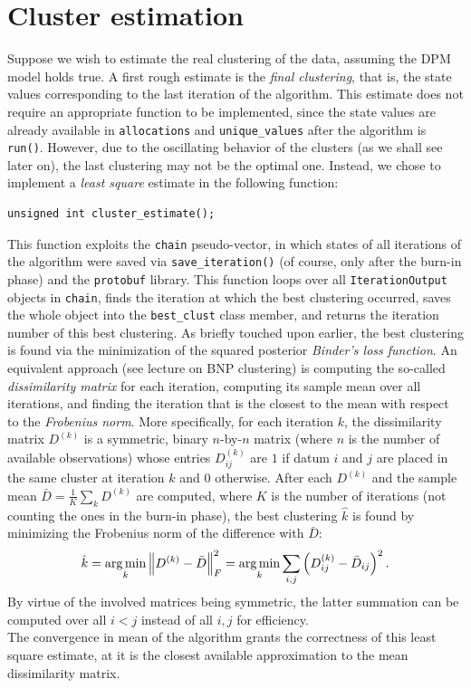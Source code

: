 \section{Cluster estimation}
Suppose we wish to estimate the real clustering of the data, assuming the DPM model holds true.
A first rough estimate is the \emph{final clustering}, that is, the state values corresponding to the last iteration of the algorithm.
This estimate does not require an appropriate function to be implemented, since the state values are already available in \verb|allocations| and \verb|unique_values| after the algorithm is \verb|run()|.
However, due to the oscillating behavior of the clusters (as we shall see later on), the last clustering may not be the optimal one.
Instead, we chose to implement a \emph{least square} estimate in the following function:
\begin{verbatim}
unsigned int cluster_estimate();
\end{verbatim}
This function exploits the \verb|chain| pseudo-vector, in which states of all iterations of the algorithm were saved via \verb|save_iteration()| (of course, only after the burn-in phase) and the \verb|protobuf| library.
This function loops over all \verb|IterationOutput| objects in \verb|chain|, finds the iteration at which the best clustering occurred, saves the whole object into the \verb|best_clust| class member, and returns the iteration number of this best clustering.
As briefly touched upon earlier, the best clustering is found via the minimization of the squared posterior \emph{Binder's loss function}.
An equivalent approach (see \cite{beep} lecture on BNP clustering) is computing the so-called \emph{dissimilarity matrix} for each iteration, computing its sample mean over all iterations, and finding the iteration that is the closest to the mean with respect to the \emph{Frobenius norm}. 
More specifically, for each iteration $k$, the dissimilarity matrix $D^{(k)}$ is a symmetric, binary $n$-by-$n$ matrix (where $n$ is the number of available observations) whose entries $D^{(k)}_{ij}$ are $1$ if datum $i$ and $j$ are placed in the same cluster at iteration $k$ and $0$ otherwise.
After each $D^{(k)}$ and the sample mean $\bar{D} = \frac{1}{K} \sum_k D^{(k)}$ are computed, where $K$ is the number of iterations (not counting the ones in the burn-in phase), the best clustering $\hat{k}$ is found by minimizing the Frobenius norm of the difference with $\bar{D}$:
$$
\hat{k} = \operatorname*{arg\,min}_k \left\lVert D^{(k)} - \bar D \right\rVert_F^2 = \operatorname*{arg\,min}_k \sum_{i,j} \left( D^{(k)}_{ij} - \bar{D}_{ij} \right)^2.
$$
By virtue of the involved matrices being symmetric, the latter summation can be computed over all $i<j$ instead of all $i,j$ for efficiency. \\
The convergence in mean of the algorithm grants the correctness of this least square estimate, at it is the closest available approximation to the mean dissimilarity matrix.

